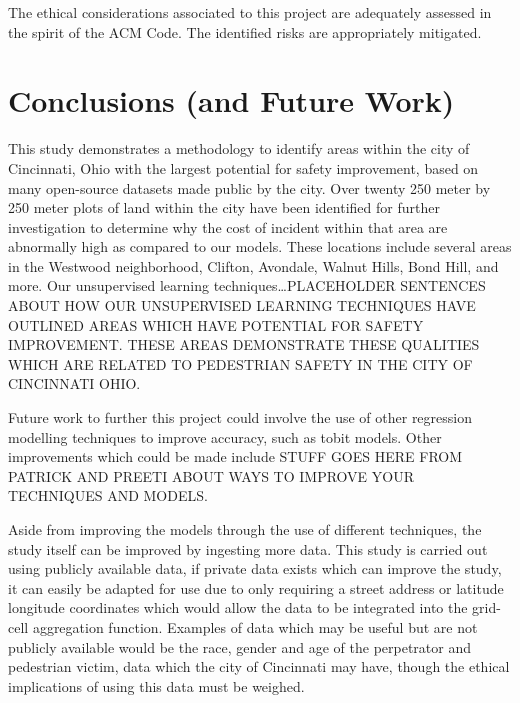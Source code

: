 \documentclass{llncs}
\begin{document}
The ethical considerations associated to this project are adequately assessed in the spirit of the ACM Code. The identified risks are appropriately mitigated.
%
\section{Conclusions (and Future Work)}
%

This study demonstrates a methodology to identify areas within the city of Cincinnati, Ohio with the largest potential for safety improvement, based on many open-source datasets made public by the city. Over twenty 250 meter by 250 meter plots of land within the city have been identified for further investigation to determine why the cost of incident within that area are abnormally high as compared to our models. These locations include several areas in the Westwood neighborhood, Clifton, Avondale, Walnut Hills, Bond Hill, and more. Our unsupervised learning techniques…PLACEHOLDER SENTENCES ABOUT HOW OUR UNSUPERVISED LEARNING TECHNIQUES HAVE OUTLINED AREAS WHICH HAVE POTENTIAL FOR SAFETY IMPROVEMENT. THESE AREAS DEMONSTRATE THESE QUALITIES WHICH ARE RELATED TO PEDESTRIAN SAFETY IN THE CITY OF CINCINNATI OHIO.

Future work to further this project could involve the use of other regression modelling techniques to improve accuracy, such as tobit models. Other improvements which could be made include STUFF GOES HERE FROM PATRICK AND PREETI ABOUT WAYS TO IMPROVE YOUR TECHNIQUES AND MODELS.

Aside from improving the models through the use of different techniques, the study itself can be improved by ingesting more data. This study is carried out using publicly available data, if private data exists which can improve the study, it can easily be adapted for use due to only requiring a street address or latitude longitude coordinates which would allow the data to be integrated into the grid-cell aggregation function. Examples of data which may be useful but are not publicly available would be the race, gender and age of the perpetrator and pedestrian victim, data which the city of Cincinnati may have, though the ethical implications of using this data must be weighed. 

%


\end{document}
